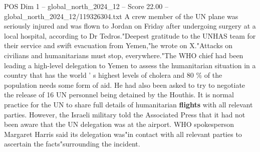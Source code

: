 \begin{textsample}{POS Dim 1 – global\_north\_2024\_12 – Score 22.00 – global\_north\_2024\_12/119326304.txt}
A crew member of the UN plane was seriously injured and was flown to Jordan on Friday after undergoing surgery at a local hospital, according to Dr Tedros."Deepest gratitude to the UNHAS team for their service and swift evacuation from Yemen,"he wrote on X."Attacks on civilians and humanitarians must stop, everywhere."The WHO chief had been leading a high-level delegation to Yemen to assess the humanitarian situation in a country that has the world ' s highest levels of cholera and 80 \% of the population needs some form of aid.
He had also been asked to try to negotiate the release of 16 UN personnel being detained by the Houthis.
It is normal practice for the UN to share full details of humanitarian \textbf{flights} with all relevant parties.
However, the Israeli military told the Associated Press that it had not been aware that the UN delegation was at the airport.
WHO spokesperson Margaret Harris said its delegation was"in contact with all relevant parties to ascertain the facts"surrounding the incident.

\end{textsample}

